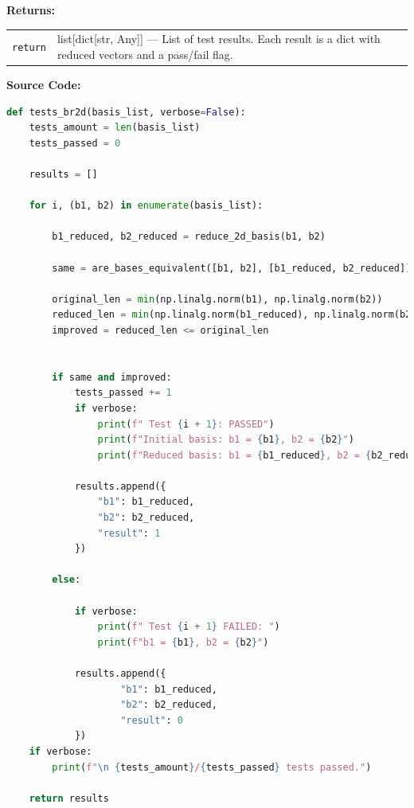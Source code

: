 \documentclass[a4paper,12pt]{article}
\begin{document}
\vspace{1em}
\noindent
\textbf{Returns:}

\begin{tabular}{p{3cm} p{11cm}}
\texttt{return} & list[dict[str, Any]] — List of test results. Each result is a dict with reduced vectors and a pass/fail flag. \\
\end{tabular}

\vspace{1em}
\textbf{Source Code:}

\begin{lstlisting}[language=Python]
def tests_br2d(basis_list, verbose=False):
    tests_amount = len(basis_list)
    tests_passed = 0

    results = []

    for i, (b1, b2) in enumerate(basis_list):

        b1_reduced, b2_reduced = reduce_2d_basis(b1, b2)

        same = are_bases_equivalent([b1, b2], [b1_reduced, b2_reduced])

        original_len = min(np.linalg.norm(b1), np.linalg.norm(b2))
        reduced_len = min(np.linalg.norm(b1_reduced), np.linalg.norm(b2_reduced))
        improved = reduced_len <= original_len


        if same and improved:
            tests_passed += 1
            if verbose:
                print(f" Test {i + 1}: PASSED")
                print(f"Initial basis: b1 = {b1}, b2 = {b2}")
                print(f"Reduced basis: b1 = {b1_reduced}, b2 = {b2_reduced}")

            results.append({
                "b1": b1_reduced,
                "b2": b2_reduced,
                "result": 1
            })

        else:

            if verbose:
                print(f" Test {i + 1} FAILED: ")
                print(f"b1 = {b1}, b2 = {b2}")

            results.append({
                    "b1": b1_reduced,
                    "b2": b2_reduced,
                    "result": 0
            })
    if verbose:
        print(f"\n {tests_amount}/{tests_passed} tests passed.")

    return results
\end{lstlisting}




\end{document}
